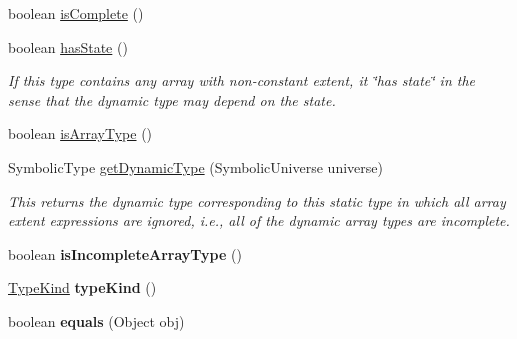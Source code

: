 \begin{DoxyCompactItemize}
\item 
boolean \hyperlink{classedu_1_1udel_1_1cis_1_1vsl_1_1civl_1_1model_1_1common_1_1type_1_1CommonArrayType_a948b0164dc970fe092ef769359f24529}{is\+Complete} ()
\item 
boolean \hyperlink{classedu_1_1udel_1_1cis_1_1vsl_1_1civl_1_1model_1_1common_1_1type_1_1CommonArrayType_aba80cab5dd20cab3d14d3685951c3a33}{has\+State} ()
\begin{DoxyCompactList}\small\item\em If this type contains any array with non-\/constant extent, it \char`\"{}has state\char`\"{} in the sense that the dynamic type may depend on the state. \end{DoxyCompactList}\item 
boolean \hyperlink{classedu_1_1udel_1_1cis_1_1vsl_1_1civl_1_1model_1_1common_1_1type_1_1CommonArrayType_aee1fb4be0cd242cd329f995be888245a}{is\+Array\+Type} ()
\item 
Symbolic\+Type \hyperlink{classedu_1_1udel_1_1cis_1_1vsl_1_1civl_1_1model_1_1common_1_1type_1_1CommonArrayType_a66d8bcc6cbbcc59194169f67f2524467}{get\+Dynamic\+Type} (Symbolic\+Universe universe)
\begin{DoxyCompactList}\small\item\em This returns the dynamic type corresponding to this static type in which all array extent expressions are ignored, i.\+e., all of the dynamic array types are incomplete. \end{DoxyCompactList}\item 
\hypertarget{classedu_1_1udel_1_1cis_1_1vsl_1_1civl_1_1model_1_1common_1_1type_1_1CommonArrayType_aa6caf898dbac9481d0bcace2a0387539}{}boolean {\bfseries is\+Incomplete\+Array\+Type} ()\label{classedu_1_1udel_1_1cis_1_1vsl_1_1civl_1_1model_1_1common_1_1type_1_1CommonArrayType_aa6caf898dbac9481d0bcace2a0387539}

\item 
\hypertarget{classedu_1_1udel_1_1cis_1_1vsl_1_1civl_1_1model_1_1common_1_1type_1_1CommonArrayType_a5a879801997c77ba31ff62bb5d940ef2}{}\hyperlink{enumedu_1_1udel_1_1cis_1_1vsl_1_1civl_1_1model_1_1IF_1_1type_1_1CIVLType_1_1TypeKind}{Type\+Kind} {\bfseries type\+Kind} ()\label{classedu_1_1udel_1_1cis_1_1vsl_1_1civl_1_1model_1_1common_1_1type_1_1CommonArrayType_a5a879801997c77ba31ff62bb5d940ef2}

\item 
\hypertarget{classedu_1_1udel_1_1cis_1_1vsl_1_1civl_1_1model_1_1common_1_1type_1_1CommonArrayType_a55b5db3c114bcff707625a865ea73719}{}boolean {\bfseries equals} (Object obj)\label{classedu_1_1udel_1_1cis_1_1vsl_1_1civl_1_1model_1_1common_1_1type_1_1CommonArrayType_a55b5db3c114bcff707625a865ea73719}


\end{DoxyCompactItemize}
